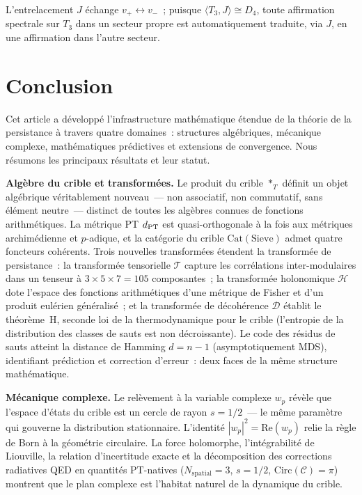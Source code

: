 \documentclass[12pt,a4paper]{article}
\begin{document}
\begin{remarque}
L'entrelacement $J$ échange $v_+ \leftrightarrow v_-$~; puisque
$\langle T_3, J \rangle \cong D_4$, toute affirmation spectrale sur
$T_3$ dans un secteur propre est automatiquement traduite, via $J$,
en une affirmation dans l'autre secteur.
\end{remarque}

\newpage

\section{Conclusion}
\label{sec:conclusion}

Cet article a développé l'infrastructure mathématique étendue de la
théorie de la persistance à travers quatre domaines~: structures
algébriques, mécanique complexe, mathématiques prédictives et
extensions de convergence. Nous résumons les principaux résultats et
leur statut.

\textbf{Algèbre du crible et transformées.}
Le produit du crible $*_T$ définit un objet algébrique véritablement
nouveau~--- non associatif, non commutatif, sans élément neutre~---
distinct de toutes les algèbres connues de fonctions arithmétiques.
La métrique PT $d_{\rm PT}$ est quasi-orthogonale à la fois aux
métriques archimédienne et $p$-adique, et la catégorie du crible
$\mathrm{Cat}(\mathrm{Sieve})$ admet quatre foncteurs cohérents.
Trois nouvelles transformées étendent la transformée de persistance~:
la transformée tensorielle $\mathcal{T}$ capture les corrélations
inter-modulaires dans un tenseur à $3{\times}5{\times}7 = 105$
composantes~; la transformée holonomique $\mathcal{H}$ dote l'espace
des fonctions arithmétiques d'une métrique de Fisher et d'un produit
eulérien généralisé~; et la transformée de décohérence $\mathcal{D}$
établit le théorème~H, seconde loi de la thermodynamique pour le
crible (l'entropie de la distribution des classes de sauts est non
décroissante). Le code des résidus de sauts atteint la distance de
Hamming $d = n - 1$ (asymptotiquement MDS), identifiant prédiction et
correction d'erreur~: deux faces de la même structure mathématique.

\textbf{Mécanique complexe.}
Le relèvement à la variable complexe $w_p$ révèle que l'espace
d'états du crible est un cercle de rayon $s = 1/2$~--- le même
paramètre qui gouverne la distribution stationnaire. L'identité
$|w_p|^2 = \mathrm{Re}(w_p)$ relie la règle de Born à la géométrie
circulaire. La force holomorphe, l'intégrabilité de Liouville, la
relation d'incertitude exacte et la décomposition des corrections
radiatives QED en quantités PT-natives ($N_{\mathrm{spatial}} = 3$,
$s = 1/2$, $\mathrm{Circ}(\mathcal{C}) = \pi$) montrent que le plan
complexe est l'habitat naturel de la dynamique du crible.
\end{document}
